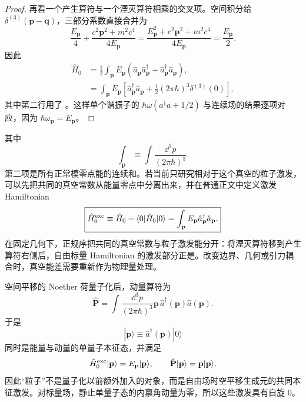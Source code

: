 \begin{proof}
再看一个产生算符与一个湮灭算符相乘的交叉项。空间积分给 $\delta^{(3)}(\mathbf p-\mathbf q)$，三部分系数直接合并为
\begin{equation*}
 \frac{E_{\mathbf p}}4+\frac{c^2\mathbf p^2+m^2c^4}{4E_{\mathbf p}}
 =\frac{E_{\mathbf p}^2+c^2\mathbf p^2+m^2c^4}{4E_{\mathbf p}}
 =\frac{E_{\mathbf p}}2.
\end{equation*}
因此
\begin{align*}
 \hat H_0
 &=\frac12\int_{\mathbf p}E_{\mathbf p}
 \left(
 \hat a_{\mathbf p}\hat a_{\mathbf p}^\dagger
 +\hat a_{\mathbf p}^\dagger\hat a_{\mathbf p}
 \right),\\
 &=\int_{\mathbf p}E_{\mathbf p}
 \left[
 \hat a_{\mathbf p}^\dagger\hat a_{\mathbf p}
 +\frac12(2\pi\hbar)^3\delta^{(3)}(0)
 \right],
 \end{align*}
其中第二行用了 。这样单个谐振子的 $\hbar\omega(a^\dagger a+1/2)$ 与连续场的结果逐项对应，因为 $\hbar\omega_{\mathbf p}=E_{\mathbf p}$。
\end{proof}
其中
\begin{equation*}
 \int_{\mathbf p}\equiv\int\frac{\dd^3 p}{(2\pi\hbar)^3}.
\end{equation*}
第二项是所有正常模零点能的连续和。若当前只研究相对于这个真空的粒子激发，可以先把共同的真空常数从能量零点中分离出来，并在普通正文中定义激发 Hamiltonian
\begin{equation}
 \boxed{
 \hat H_0^{\rm exc}
 \equiv \hat H_0-\langle0|\hat H_0|0\rangle
 =\int_{\mathbf p}E_{\mathbf p}
 \hat a_{\mathbf p}^\dagger\hat a_{\mathbf p}.}
 \label{eq:scalar-H-excitation-dp76}
\end{equation}
在固定几何下，正规序把共同的真空常数与粒子激发能分开：将湮灭算符移到产生算符右侧后，自由标量 Hamiltonian 的激发部分正是。改变边界、几何或引力耦合时，真空能差需要重新作为物理量处理。

空间平移的 Noether 荷量子化后，动量算符为
\begin{equation}
 \hat{\mathbf P}
 =\int\frac{\dd^3 p}{(2\pi\hbar)^3}
 \mathbf p\,\hat a^\dagger(\mathbf p)\hat a(\mathbf p).
 \label{eq:scalar-P-r3}
\end{equation}
于是
\begin{equation*}
 |\mathbf p\rangle\equiv\hat a^\dagger(\mathbf p)|0\rangle
\end{equation*}
同时是能量与动量的单量子本征态，并满足
\begin{equation*}
 \hat H_0^{\rm exc}|\mathbf p\rangle=E_{\mathbf p}|\mathbf p\rangle,
 \qquad
 \hat{\mathbf P}|\mathbf p\rangle=\mathbf p|\mathbf p\rangle.
\end{equation*}
因此“粒子”不是量子化以前额外加入的对象，而是自由场时空平移生成元的共同本征激发。对标量场，静止单量子态的内禀角动量为零，所以这些激发具有自旋 $0$。

